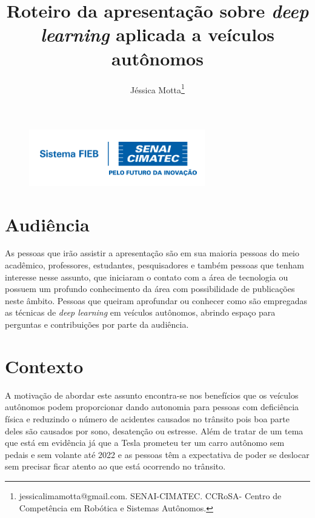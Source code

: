 \documentclass[12pt,a4paper]{article}
\begin{document}
 
\begin{figure}
    \flushright
    \includegraphics[scale=0.5]{Logo_senai.png}
\end{figure}

\title{Roteiro da apresentação sobre \emph{deep learning} aplicada a veículos autônomos}
\author{Jéssica Motta\thanks{jessicalimamotta@gmail.com. SENAI-CIMATEC. CCRoSA- Centro de Competência em Robótica e Sistemas Autônomos.}}
 

    \maketitle
    \singlespacing

    \section{Audiência}

    \par As pessoas que irão assistir a apresentação são em sua maioria pessoas do meio acadêmico, professores, estudantes, pesquisadores e também pessoas que tenham interesse nesse assunto, que iniciaram o contato com a área de tecnologia ou possuem um profundo conhecimento da área com possibilidade de publicações neste âmbito. Pessoas que queiram aprofundar ou conhecer como são empregadas as técnicas de \emph{deep learning} em veículos autônomos, abrindo espaço para perguntas e contribuições por parte da audiência.

    \section{Contexto}
    \par A motivação de abordar este assunto encontra-se nos benefícios que os veículos autônomos podem proporcionar dando autonomia para pessoas com deficiência física e reduzindo o número de acidentes causados no trânsito pois boa parte deles são causados por sono, desatenção ou estresse. Além de tratar de um tema que está em evidência já que a Tesla prometeu ter um carro autônomo sem pedais e sem volante até 2022 e as pessoas têm a expectativa de poder se deslocar sem precisar ficar atento ao que está ocorrendo no trânsito.
  
\end{document}
